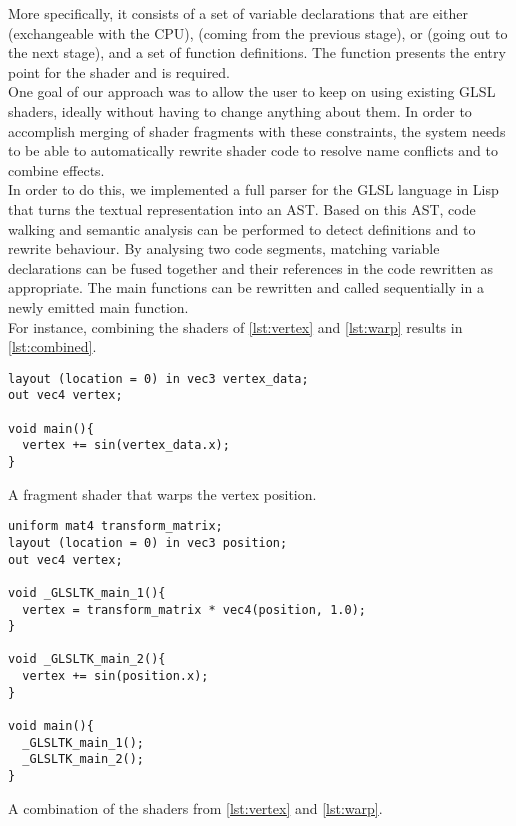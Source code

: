 \documentclass{sig-alternate}
\begin{document}
More specifically, it consists of a set of variable declarations that are either  (exchangeable with the CPU),  (coming from the previous stage), or  (going out to the next stage), and a set of function definitions. The  function presents the entry point for the shader and is required. \\

One goal of our approach was to allow the user to keep on using existing GLSL shaders, ideally without having to change anything about them. In order to accomplish merging of shader fragments with these constraints, the system needs to be able to automatically rewrite shader code to resolve name conflicts and to combine effects. \\

In order to do this, we implemented a full parser for the GLSL language in Lisp that turns the textual representation into an AST. Based on this AST, code walking and semantic analysis can be performed to detect definitions and to rewrite behaviour. By analysing two code segments, matching variable declarations can be fused together and their references in the code rewritten as appropriate. The main functions can be rewritten and called sequentially in a newly emitted main function. \\

For instance, combining the shaders of \autoref{lst:vertex} and \autoref{lst:warp} results in \autoref{lst:combined}. \\

\begin{listing}[H]
\begin{verbatim}
layout (location = 0) in vec3 vertex_data;
out vec4 vertex;

void main(){
  vertex += sin(vertex_data.x);
}
\end{verbatim}
\caption{A fragment shader that warps the vertex position.}
\label{lst:warp}
\end{listing}

\begin{listing}[h]
\begin{verbatim}
uniform mat4 transform_matrix;
layout (location = 0) in vec3 position;
out vec4 vertex;

void _GLSLTK_main_1(){
  vertex = transform_matrix * vec4(position, 1.0);
}

void _GLSLTK_main_2(){
  vertex += sin(position.x);
}

void main(){
  _GLSLTK_main_1();
  _GLSLTK_main_2();
}
\end{verbatim}
\caption{A combination of the shaders from \autoref{lst:vertex} and \autoref{lst:warp}.}
\label{lst:combined}
\end{listing}
\end{document}
